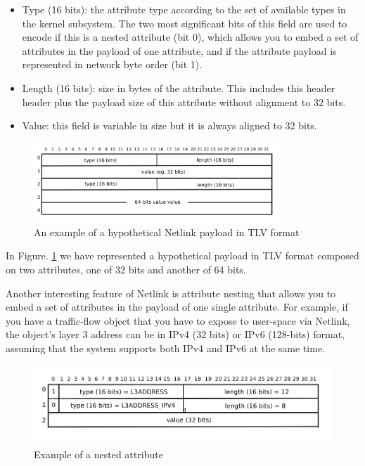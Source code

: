 \documentclass[10pt,onecolumn]{article}
\begin{document}
\begin{itemize}
\item Type (16 bits): the attribute type according to the set of available types in the kernel subsystem. The two most significant bits of this field are used to encode if this is a nested attribute (bit 0), which allows you to embed a set of attributes in the payload of one attribute, and if the attribute payload is represented in network byte order (bit 1).
\item Length (16 bits): size in bytes of the attribute. This includes this header header plus the payload size of this attribute without alignment to 32 bits.
\item Value: this field is variable in size but it is always aligned to 32 bits.
\end{itemize}

\begin{figure}[h]
\begin{center}
\includegraphics[height=3cm]{figure/netlink_payload.png}
\end{center}
\caption{An example of a hypothetical Netlink payload in TLV format}
\label{fig:netlink_payload}
\end{figure}

In Figure. \ref{fig:netlink_payload} we have represented a hypothetical payload in TLV format composed on two attributes, one of 32 bits and another of 64 bits.

Another interesting feature of Netlink is attribute nesting that allows you to embed a set of attributes in the payload of one single attribute. For example, if you have a traffic-flow object that you have to expose to user-space via Netlink, the object's layer 3 address can be in IPv4 (32 bits) or IPv6 (128-bits) format, assuming that the system supports both IPv4 and IPv6 at the same time.

\begin{figure}[h]
\begin{center}
\includegraphics[height=3cm]{figure/netlink_nested_attribute.png}
\end{center}
\caption{Example of a nested attribute}
\label{fig:netlink_nested_attribute}
\end{figure}
\end{document}

